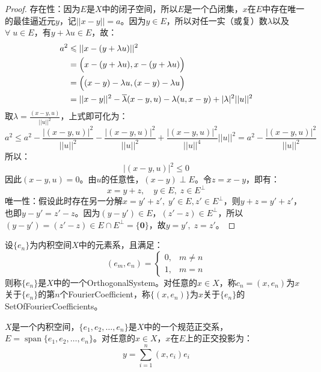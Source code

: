 \begin{proof}
	存在性：因为$E$是$X$中的闭子空间，所以$E$是一个凸闭集，$x$在$E$中存在唯一的最佳逼近元$y$，记$||x-y||=a$。因为$y\in E$，所以对任一实（或复）数$\lambda$以及$\forall\;u\in E$，有$y+\lambda u\in E$，故：
	\begin{align*}
		a^2
		&\leqslant||x-(y+\lambda u)||^2 \\
		&=\Bigl(x-(y+\lambda u),x-(y+\lambda u)\Bigr) \\
		&=\Bigl((x-y)-\lambda u,(x-y)-\lambda u\Bigr) \\
		&=||x-y||^2-\overline{\lambda}(x-y,u)-\lambda(u,x-y)+|\lambda|^2||u||^2
	\end{align*}
	取$\lambda=\frac{(x-y,u)}{||u||^2}$，上式即可化为：
	\begin{equation*}
		a^2\leqslant a^2-\frac{|(x-y,u)|^2}{||u||^2}-\frac{|(x-y,u)|^2}{||u||^2}+\frac{|(x-y,u)|^2}{||u||^4}||u||^2=a^2-\frac{|(x-y,u)|^2}{||u||^2}
	\end{equation*}
	所以：
	\begin{equation*}
		|(x-y,u)|^2\leqslant0
	\end{equation*}
	因此$(x-y,u)=0$。由$u$的任意性，$(x-y)\perp E$。令$z=x-y$，即有：
	\begin{equation*}
		x=y+z,\quad y\in E,\;z\in E^{\perp}
	\end{equation*}
	\hspace{3em}唯一性：假设此时存在另一分解$x=y'+z',\;y'\in E,z'\in E^{\perp}$，则$y+z=y'+z'$，也即$y-y'=z'-z$。因为$(y-y')\in E$，$(z'-z)\in E^{\perp}$，所以$(y-y')=(z'-z)\in E\cap E^{\perp}=\{\mathbf{0}\}$，故$y=y',\;z=z'$。
\end{proof}
\begin{definition}
	设$\{e_n\}$为内积空间$X$中的元素系，且满足：
	\begin{equation*}
		(e_m,e_n)=
		\begin{cases}
			0,&m\ne n \\
			1,&m=n
		\end{cases}
	\end{equation*}
	则称$\{e_n\}$是$X$中的一个\gls{OrthogonalSystem}。对任意的$x\in X$，称$c_n=(x,e_n)$为$x$关于$\{e_n\}$的第$n$个\gls{FourierCoefficient}，称$\{(x,e_n)\}$为$x$关于$\{e_n\}$的\gls{SetOfFourierCoefficients}。
\end{definition}
\begin{theorem}
	$X$是一个内积空间，$\{e_1,e_2,\dots,e_n\}$是$X$中的一个规范正交系，$E=\operatorname{span}\{e_1,e_2,\dots,e_n\}$。对任意的$x\in X$，$x$在$E$上的正交投影为：
	\begin{equation*}
		y=\sum_{i=1}^{n}(x,e_i)e_i
	\end{equation*}
\end{theorem}
